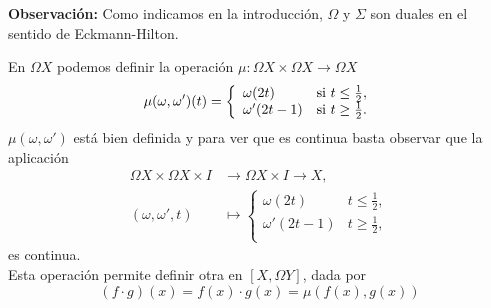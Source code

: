 \textbf{Observación:} Como indicamos en la introducción, $\Omega$ y $\Sigma$ son duales en el sentido de Eckmann-Hilton. \par

En $\Omega X$ podemos definir la operación  $\mu : \Omega X \times \Omega X \longrightarrow \Omega X$
\[
\mu(\omega, \omega')(t) = 
\left\{ \begin{array}{ll}
             \omega(2t)		&   $si $ t \leq \frac{1}{2}, \\
             \omega'(2t-1)	&   $si $ t \geq \frac{1}{2}. \\
        \end{array}
\right.
\]
$\mu(\omega, \omega')$ está bien definida y para ver que es continua basta observar que la aplicación
\begin{align*}
\Omega X \times \Omega X \times I &\longrightarrow \Omega X \times I \longrightarrow X, \\
(\omega, \omega', t) &\longmapsto 
\left\{ \begin{array}{ll}
             \omega(2t)		&  t \leq \frac{1}{2}, \\
             \omega'(2t-1)	&  t \geq \frac{1}{2}, \\
        \end{array}
\right.
\end{align*}
 es continua. \\
Esta operación permite definir otra en $[X, \Omega Y]$, dada por 
\[ (f \cdotp g)(x) = f(x) \cdotp g(x) = \mu(f(x), g(x)) \]

